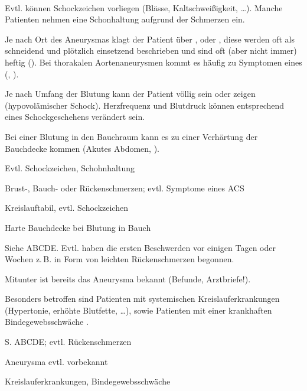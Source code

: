 {\TxABCDE}
{~
\begin{ABCDEText}
  \item[\ABCDE{2}] Evtl. können
  Schockzeichen vorliegen (Blässe, Kaltschweißigkeit,
  \ldots).
  Manche Patienten nehmen eine Schonhaltung aufgrund der
  Schmerzen ein.
  \item[\ABCDE{4}] Je nach Ort des
  Aneurysmas klagt der Patient über , 
  oder , diese werden oft als schneidend
  und plötzlich einsetzend beschrieben und sind oft (aber nicht immer) heftig
  (). Bei thorakalen
  Aortenaneurysmen kommt es häufig zu Symptomen eines
   (, ).
  \item[\ABCDE{C}] Je nach Umfang der Blutung kann
  der Patient völlig  sein oder
   zeigen (hypovolämischer Schock).
  Herzfrequenz und Blutdruck können entsprechend eines
  Schockgeschehens verändert sein.
  \item[\ABCDE{E}] Bei einer Blutung in den Bauchraum 
  kann es zu einer Verhärtung 
  der Bauchdecke kommen (Akutes Abdomen, 
  ). 
\end{ABCDEText}
}
{
\begin{ABCDESlide}
  \item[\ABCDE{2}] Evtl. Schockzeichen, Schohnhaltung
  \item[\ABCDE{4}] Brust-, Bauch- oder Rückenschmerzen;
  evtl. Symptome eines ACS
  \item[\ABCDE{C}] Kreislauftabil, evtl. Schockzeichen
  \item[\ABCDE{E}] Harte Bauchdecke bei Blutung in Bauch
\end{ABCDESlide}
}
{}
{}
{}

{{\TxSAMPLER}}
{
\begin{SAMPLERText}
  \item[\SAMPLER{S}] Siehe ABCDE. Evtl. haben die ersten
  Beschwerden vor einigen Tagen oder Wochen z.\,B. in Form
  von leichten Rückenschmerzen begonnen. 
  \item[\SAMPLER{P}] Mitunter ist bereits das Aneurysma
  bekannt (Befunde, Arztbriefe!).
  \item[\SAMPLER{R}] Besonders betroffen sind Patienten mit
  systemischen Kreislauferkrankungen (Hypertonie, erhöhte
  Blutfette, \ldots), sowie Patienten mit einer krankhaften
  Bindegewebsschwäche .
\end{SAMPLERText}
}
{
\begin{SAMPLERSlide}
  \item[\SAMPLER{S}] S. ABCDE; evtl. Rückenschmerzen
  \item[\SAMPLER{P}] Aneurysma evtl. vorbekannt 
  \item[\SAMPLER{R}] Kreislauferkrankungen,
  Bindegewebsschwäche
\end{SAMPLERSlide}
}
{}
{}
{}



